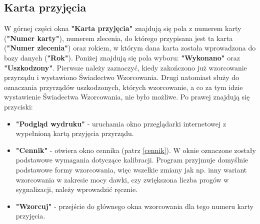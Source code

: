 \subsection{Karta przyjęcia}
\label{karta_przyjecia}

W górnej części okna \textbf{"Karta przyjęcia"} znajdują się pola z numerem karty (\textbf{"Numer karty"}), numerem zlecenia, do którego przypisana jest ta karta (\textbf{"Numer zlecenia"}) oraz rokiem, w którym dana karta została wprowadzona do bazy danych (\textbf{"Rok"}).
Poniżej znajdują się pola wyboru: \textbf{"Wykonano"} oraz \textbf{"Uszkodzony"}. Pierwsze należy zaznaczyć, kiedy zakończono już wzorcowanie przyrządu i wystawiono Świadectwo Wzorcowania. Drugi natomiast służy do oznaczania przyrządów uszkodzonych, których wzorcowanie, a co za tym idzie wystawienie Świadectwa Wzorcowania, nie było możliwe.
Po prawej znajdują się przyciski:
\begin{itemize}
	\item \textbf{"Podgląd wydruku"} - uruchamia okno przeglądarki internetowej z wypełnioną kartą przyjęcia przyrządu.
	\item \textbf{"Cennik"} - otwiera okno cennika (patrz \ref{cennik}). W oknie oznaczone zostały podstawowe wymagania dotyczące kalibracji. Program przyjmuje domyślnie podstawowe formy wzorcowania, więc wszelkie zmiany jak np. inny wariant wzorcowania w zakresie mocy dawki, czy zwiększona liczba progów w sygnalizacji, należy wprowadzić ręcznie.
	\item \textbf{"Wzorcuj"} - przejście do głównego okna wzorcowania dla tego numeru karty przyjęcia.
\end{itemize}

